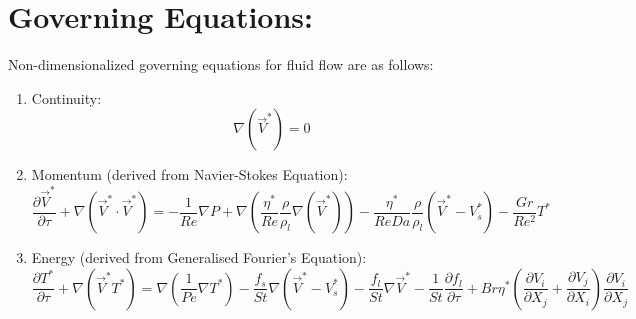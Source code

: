 \documentclass{report}
\begin{document}
\section{Governing Equations:}
Non-dimensionalized governing equations for fluid flow are as follows:

\begin{enumerate}

    \item Continuity: \[\nabla (\vec{V}^*) = 0\]
    
    \item Momentum (derived from Navier-Stokes Equation): \[\frac{\partial\vec{V}^*}{\partial\tau} + \nabla(\vec{V}^*\cdot\vec{V}^*) = -\frac{1}{Re}\nabla P + \nabla\left(\frac{\eta^*}{Re} \frac{\rho}{\rho_l} \nabla(\vec{V}^*)\right) - \frac{\eta^*}{Re Da} \frac{\rho}{\rho_l}(\vec{V}^* - V^*_s) - \frac{Gr}{Re^2} T^* \]

    \item Energy (derived from Generalised Fourier's Equation): 
    \[\frac{\partial T^*}{\partial\tau} + \nabla(\vec{V}^* T^*) = \nabla \left({\frac{1}{Pe} \nabla T^*} \right) - \frac{f_s}{St} \nabla(\vec{V}^* - V^*_s) - \frac{f_l}{St}\nabla \vec{V}^* - \frac{1}{St} \frac{\partial{f_l}}{\partial \tau}+ Br\eta^* \left(\frac{\partial V_i}{\partial X_j} + \frac{\partial V_j}{\partial X_i}\right) \frac{\partial V_i}{\partial X_j}\]

\end{enumerate}
\end{document}
